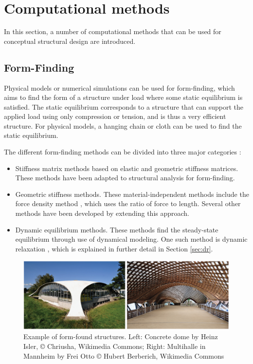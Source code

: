 \chapter{Computational methods}
\label{ch:Computational methods}
In this section, a number of computational methods that can be used for conceptual structural design are introduced. 

\section{Form-Finding}
Physical models or numerical simulations can be used for form-finding, which aims to find the form of a structure under load where some static equilibrium is satisfied. The static equilibrium corresponds to a structure that can support the applied load using only compression or tension, and is thus a very efficient structure. For physical models, a hanging chain or cloth can be used to find the static equilibrium.

The different form-finding methods can be divided into three major categories \cite{Veenendaal2012a}: 

\begin{itemize} 
\item Stiffness matrix methods based on elastic and geometric stiffness matrices. These methods have been adapted to structural analysis for form-finding.
\item Geometric stiffness methods. These material-independent methods include the force density method \cite{Schek1974}, which uses the ratio of force to length. Several other methods have been developed by extending this approach.
\item Dynamic equilibrium methods. These methods find the steady-state equilibrium through use of dynamical modeling. One such method is dynamic relaxation \cite{Day1965}, which is explained in further detail in Section \ref{sec:dr}.
\end{itemize} 

\begin{figure}
  \includegraphics[width=380pt]{graphics/formfinding-ex.jpg}
  \caption{Example of form-found structures. Left: Concrete dome by Heinz Isler, © Chriusha, Wikimedia Commons; Right: Multihalle in Mannheim by Frei Otto © Hubert Berberich, Wikimedia Commons}
  \label{fig:Stevin}
\end{figure}

